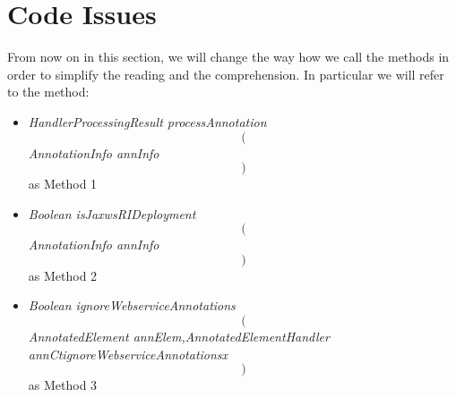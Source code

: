\section{Code Issues}
From now on in this section, we will change the way how we call the methods in order to simplify the reading and the comprehension. \newline
In particular we will refer to the method:
\begin{itemize}
	\item \textit{HandlerProcessingResult processAnnotation $$($$AnnotationInfo annInfo$$)$$} as Method 1
	\item \textit{Boolean isJaxwsRIDeployment $$($$AnnotationInfo annInfo$$)$$} as Method 2
	\item \textit{Boolean ignoreWebserviceAnnotations $$($$AnnotatedElement annElem,AnnotatedElementHandler annCtignoreWebserviceAnnotationsx$$)$$} as Method 3

\end{itemize}

